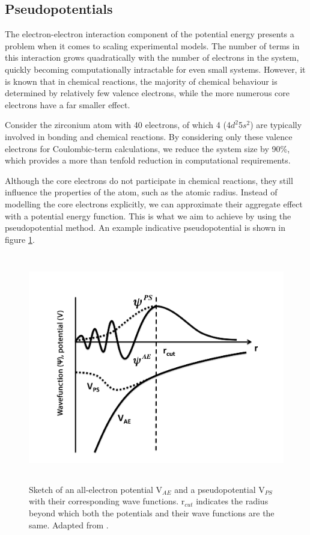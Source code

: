\subsection{Pseudopotentials}

The electron-electron interaction component of the potential energy presents a problem when it comes to scaling experimental models. The number of terms in this interaction grows quadratically with the number of electrons in the system, quickly becoming computationally intractable for even small systems. However, it is known that in chemical reactions, the majority of chemical behaviour is determined by relatively few valence electrons, while the more numerous core electrons have a far smaller effect. 

Consider the zirconium atom with 40 electrons, of which 4 (4$d^2$5$s^2$) are typically involved in bonding and chemical reactions. By considering only these valence electrons for Coulombic-term calculations, we reduce the system size by 90\%, which provides a more than tenfold reduction in computational requirements.

Although the core electrons do not participate in chemical reactions, they still influence the properties of the atom, such as the atomic radius. Instead of modelling the core electrons explicitly, we can approximate their aggregate effect with a potential energy function. This is what we aim to achieve by using the pseudopotential method. An example indicative pseudopotential is shown in figure \ref{figure:pseudopotential}.

\begin{figure}[ht] %
\begin{center}
\includegraphics[height=10cm]{images/pseudopotential.png}
\end{center}
\caption[Sketch of an all-electron potential V$_{AE}$ and a pseudopotential V$_{PS}$ with their corresponding wave functions. r$_{cut}$ indicates the radius beyond which both the potentials and their wave functions are the same.]{Sketch of an all-electron potential V$_{AE}$ and a pseudopotential V$_{PS}$ with their corresponding wave functions. r$_{cut}$ indicates the radius beyond which both the potentials and their wave functions are the same. Adapted from \cite{Payne1992}.}
\label{figure:pseudopotential}
\end{figure}

